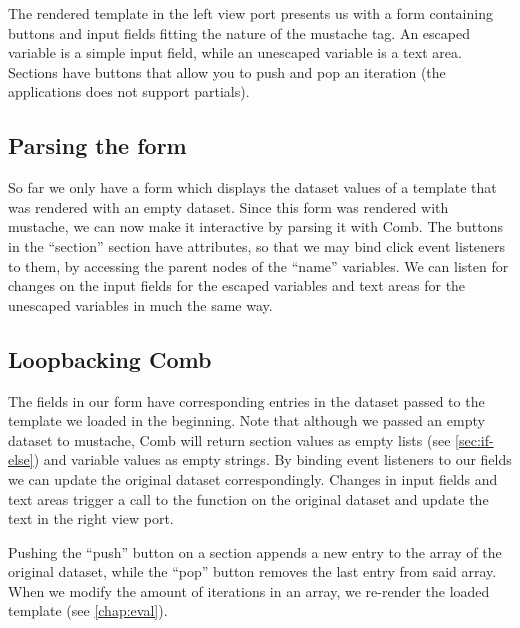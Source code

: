 \documentclass[thesis.tex]{subfiles}
\begin{document}
The rendered template in the left view port presents us with a form containing
buttons and input fields fitting the nature of the mustache tag.
An escaped variable is a simple input field,
while an unescaped variable is a text area.
Sections have buttons that allow you to push and pop an iteration
(the applications does not support partials).

\subsection{Parsing the form}

So far we only have a form which displays the dataset values of a template that
was rendered with an empty dataset.
Since this form was rendered with mustache, we can now make it interactive by
parsing it with Comb. The buttons in the ``section'' section have
 attributes, so that we may bind click event listeners to
them, by accessing the parent nodes of the ``name'' variables. We can listen
for changes on the input fields for the escaped variables and text areas for the
unescaped variables in much the same way.

\subsection{Loopbacking Comb}

The fields in our form have corresponding entries in the dataset passed to
the template we loaded in the beginning.
Note that although we passed an empty dataset to mustache, Comb will return
section values as empty lists (see \ref{sec:if-else}) and
variable values as empty strings.
By binding event listeners to our fields we can update the original dataset
correspondingly. Changes in input fields and text areas trigger a call to the
 function on the original dataset and update the text in the
right view port.

Pushing the ``push'' button on a section appends a new entry to the array of the
original dataset, while the ``pop'' button removes the last entry from said array.
When we modify the amount of iterations in an array, we re-render the loaded
template (see \ref{chap:eval}).
\end{document}
